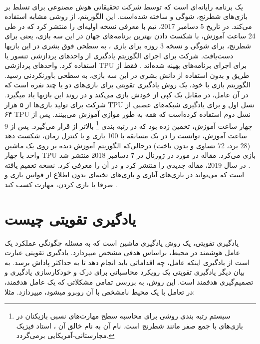 \paragraph{}
یک برنامه رایانه‌ای است که توسط شرکت تحقیقاتی هوش مصنوعی
 برای تسلط بر بازی‌های شطرنج، شوگی و 
ساخته شده‌است. این الگوریتم، از روشی مشابه
  استفاده می‌کند. در تاریخ 5 دسامبر 2017،  تیم
  با معرفی
   نسخه اولیه‌ای را منتشر کرد که در طی 24 ساعت آموزش، با شکست دادن بهترین برنامه‌های جهان در این سه بازی، یعنی
    برای شطرنج،
برای شوگی و نسخه 3 روزه
برای بازی 
،
به سطحی فوق بشری در این بازی\nf ها دست‌یافت.  شرکت 
برای اجرای الگوریتم یادگیری
از واحدهای پردازشی تنسور 
یا 
استفاده کرد. واحدهای پردازشی TPU برای اجرای برنامه‌های
بهینه شده‌اند
\cite{silver2017}.
  فقط از طریق 
و بدون استفاده از دانش بشری در این سه بازی، به سطحی باورنکردنی رسید. الگوریتم بازی با خود، یک روش یادگیری تقویتی برای بازی‌های دو یا چند نفره است که در آن عامل، در مقابل یک کپی از خودش بازی می‌کند و در روند این بازی\nf ها یاد می\nf گیرد.
شرکت
  برای تولید  بازی‌ها از ۵ هزار TPU نسل اول و برای یادگیری شبکه‌های عصبی از ۶۴ TPU نسل دوم استفاده کرده‌است که همه به طور موازی آموزش می‌بینند.
پس از چهار ساعت آموزش،
  تخمین زده بود که
    در رتبه بندی
\footnote{سیستم رتبه بندی
	  روشی برای محاسبه سطح مهارت‌های نسبی بازیکنان در بازی‌های با جمع صفر مانند شطرنج است. نام آن به نام خالق آن
،
استاد فیزیک مجارستانی-آمریکایی برمی‌گردد.}
بالاتر از
  قرار می‌گیرد. پس از 9 ساعت آموزش، توانست
را در یک مسابقه با 100 بازی و با کنترل زمان، شکست دهد (28 برد، 72 تساوی و بدون باخت) 
\cite{silver2017} \cite{knapton2017entire} \cite{superhuman2017}
درحالی‌که الگوریتم آموزش دیده 
بر روی یک ماشین واحد با چهار TPU بازی می‌کرد.
مقاله
  در مورد
    در ژورنال
در 7 دسامبر 2018 منتشر شد
\cite{silver2018general}.
در سال 2019،
مقاله جدیدی را منتشر کرد و در آن
را معرفی کرد. 
نسخه تعمیم یافته 
است که می‌تواند در بازی‌های آتاری و بازی‌های تخته‌ای 
 بدون اطلاع از قوانین بازی و صرفا با بازی کردن، مهارت کسب کند
 \cite{alphazerowiki}.



\section{یادگیری تقویتی چیست}
یادگیری تقویتی، یک روش یادگیری ماشین است که  به مسئله چگونگی عملکرد یک عامل هوشمند  در محیط، براساس هدفی مشخص می\nf پردازد. یادگیری تقویتی عبارت است از یادگیری اینکه عامل، چه اقداماتی باید انجام دهد تا به حداکثر پاداش برسد. به بیان دیگر یادگیری تقویتی یک رویکرد محاسباتی برای درک و خودکار\nf سازی یادگیری و تصمیم‌گیری هدفمند است. این روش، به بررسی تمامی‌ مشکلاتی که یک عامل هدفمند، در تعامل با یک محیط نامشخص با آن روبرو می\nf شود، می\nf پردازد. مثلا:

